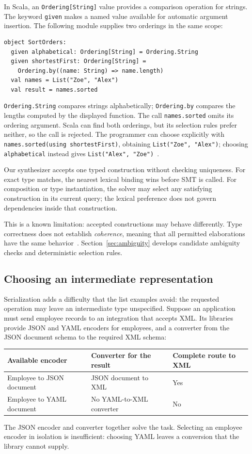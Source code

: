 \documentclass[10pt,a4paper]{article}
\begin{document}
In Scala, an \texttt{Ordering[String]} value provides a comparison operation for
strings. The keyword \texttt{given} makes a named value available for automatic
argument insertion. The following module supplies two orderings in the same scope:
\begin{lstlisting}
object SortOrders:
  given alphabetical: Ordering[String] = Ordering.String
  given shortestFirst: Ordering[String] =
    Ordering.by((name: String) => name.length)
  val names = List("Zoe", "Alex")
  val result = names.sorted
\end{lstlisting}
\texttt{Ordering.String} compares strings alphabetically;
\texttt{Ordering.by} compares the lengths computed by the displayed function.
The call \texttt{names.sorted} omits its ordering argument. Scala can find both
orderings, but its selection rules prefer neither, so the call is rejected.
The programmer can choose explicitly with
\texttt{names.sorted(using shortestFirst)}, obtaining \texttt{List("Zoe", "Alex")};
choosing \texttt{alphabetical} instead gives \texttt{List("Alex", "Zoe")}~\cite{scala-resolution}.

Our synthesizer accepts one typed construction without checking uniqueness.
For exact type matches, the nearest lexical binding wins before SMT is called.
For composition or type instantiation, the solver may select any satisfying
construction in its current query; the lexical preference does not govern
dependencies inside that construction.

This is a known limitation: accepted constructions may behave differently.
Type correctness does not establish \emph{coherence}, meaning that all permitted
elaborations have the same behavior~\cite{cochis}.
Section~\ref{sec:ambiguity} develops candidate ambiguity checks and deterministic
selection rules.

\newpage
\subsection{Choosing an intermediate representation}
Serialization adds a difficulty that the list examples avoid: the requested
operation may leave an intermediate type unspecified. Suppose an application must
send employee records to an integration that accepts XML. Its libraries provide
JSON and YAML encoders for employees, and a converter from the JSON document
schema to the required XML schema:
\begin{center}
\begin{tabular}{@{}lll@{}}
\toprule
Available encoder & Converter for the result & Complete route to XML\\
\midrule
Employee to JSON document & JSON document to XML & Yes\\
Employee to YAML document & No YAML-to-XML converter & No\\
\bottomrule
\end{tabular}
\end{center}
The JSON encoder and converter together solve the task. Selecting an employee
encoder in isolation is insufficient: choosing YAML leaves a conversion that
the library cannot supply.
\end{document}
